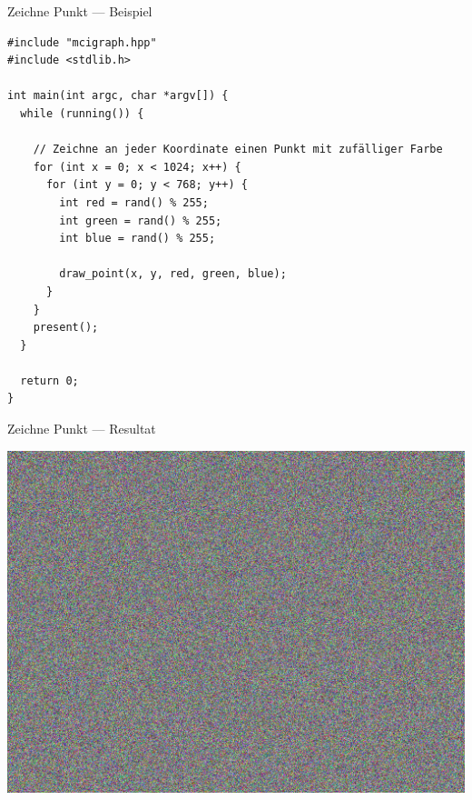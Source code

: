 \documentclass[presentation]{beamer}
\begin{document}
\begin{frame}[label={sec:orgb5f643d},fragile]{Zeichne Punkt --- Beispiel}
 \begin{verbatim}
#include "mcigraph.hpp"
#include <stdlib.h>

int main(int argc, char *argv[]) {
  while (running()) {

    // Zeichne an jeder Koordinate einen Punkt mit zufälliger Farbe
    for (int x = 0; x < 1024; x++) {
      for (int y = 0; y < 768; y++) {
        int red = rand() % 255;
        int green = rand() % 255;
        int blue = rand() % 255;

        draw_point(x, y, red, green, blue);
      }
    }
    present();
  }

  return 0;
}
\end{verbatim}
\end{frame}
\begin{frame}[label={sec:org823e30c}]{Zeichne Punkt --- Resultat}
\begin{center}\begin{center}
\includegraphics[width=.9\linewidth]{data/86/91cde7-2819-4d36-b0ad-c8c6603fdd88/screenshot-20170314-214117.png}
\end{center}\end{center}
\end{frame}
\end{document}
